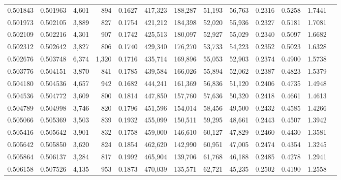\begin{tabular}{rrrrrrrrrrrrr}
0.501843 & 0.501963 &  4,601 &   894 &                                     0.1627 & 417,323 & 188,287 &  51,193 &  56,763 & 0.2316 & 0.5258 & 1.7441 \\
0.501973 & 0.502105 &  3,889 &   827 &                                     0.1754 & 421,212 & 184,398 &  52,020 &  55,936 & 0.2327 & 0.5181 & 1.7081 \\
0.502109 & 0.502216 &  4,301 &   907 &                                     0.1742 & 425,513 & 180,097 &  52,927 &  55,029 & 0.2340 & 0.5097 & 1.6682 \\
0.502312 & 0.502642 &  3,827 &   806 &                                     0.1740 & 429,340 & 176,270 &  53,733 &  54,223 & 0.2352 & 0.5023 & 1.6328 \\
0.502676 & 0.503748 &  6,374 & 1,320 &                                     0.1716 & 435,714 & 169,896 &  55,053 &  52,903 & 0.2374 & 0.4900 & 1.5738 \\
0.503776 & 0.504151 &  3,870 &   841 &                                     0.1785 & 439,584 & 166,026 &  55,894 &  52,062 & 0.2387 & 0.4823 & 1.5379 \\
0.504180 & 0.504536 &  4,657 &   942 &                                     0.1682 & 444,241 & 161,369 &  56,836 &  51,120 & 0.2406 & 0.4735 & 1.4948 \\
0.504536 & 0.504772 &  3,609 &   800 &                                     0.1814 & 447,850 & 157,760 &  57,636 &  50,320 & 0.2418 & 0.4661 & 1.4613 \\
0.504789 & 0.504998 &  3,746 &   820 &                                     0.1796 & 451,596 & 154,014 &  58,456 &  49,500 & 0.2432 & 0.4585 & 1.4266 \\
0.505066 & 0.505369 &  3,503 &   839 &                                     0.1932 & 455,099 & 150,511 &  59,295 &  48,661 & 0.2443 & 0.4507 & 1.3942 \\
0.505416 & 0.505642 &  3,901 &   832 &                                     0.1758 & 459,000 & 146,610 &  60,127 &  47,829 & 0.2460 & 0.4430 & 1.3581 \\
0.505642 & 0.505850 &  3,620 &   824 &                                     0.1854 & 462,620 & 142,990 &  60,951 &  47,005 & 0.2474 & 0.4354 & 1.3245 \\
0.505864 & 0.506137 &  3,284 &   817 &                                     0.1992 & 465,904 & 139,706 &  61,768 &  46,188 & 0.2485 & 0.4278 & 1.2941 \\
0.506158 & 0.507526 &  4,135 &   953 &                                     0.1873 & 470,039 & 135,571 &  62,721 &  45,235 & 0.2502 & 0.4190 & 1.2558 \\

\end{tabular}
